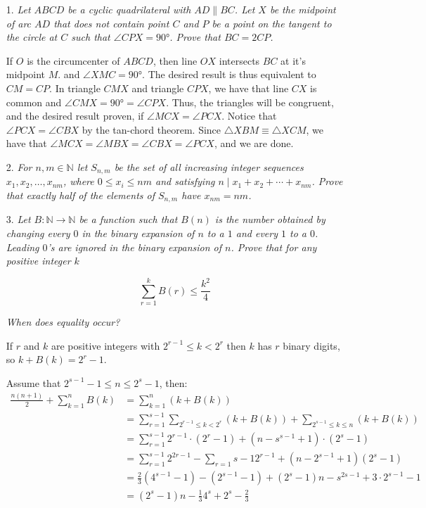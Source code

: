\documentclass{article}
\begin{document}
\begin{enumerate}

\medskip
\item[1.] %
\textit{Let $ABCD$ be a cyclic quadrilateral with $AD \parallel BC$. Let $X$ be the midpoint of arc $AD$ that does not contain point $C$ and $P$ be a point on the tangent to the circle at $C$ such that $\angle CPX = 90 \si{\degree} $. Prove that $BC = 2 CP$.}

If $O$ is the circumcenter of $ABCD$, then line $OX$ intersects $BC$ at it's midpoint $M$. and $\angle XMC = 90 \si{\degree}$. The desired result is thus equivalent to $CM = CP$. In triangle $CMX$ and triangle $CPX$, we have that line $CX$ is common and $\angle CMX = 90 \si{\degree} = \angle CPX$. Thus, the triangles will be congruent, and the desired result proven, if $\angle MCX = \angle PCX$. Notice that $\angle PCX = \angle CBX$ by the tan-chord theorem. Since $\triangle XBM \equiv \triangle XCM$, we have that $\angle MCX = \angle MBX = \angle CBX = \angle PCX$, and we are done.


\medskip
\item[2.] %
\textit{For $n,m\in\mathbb{N}$ let $S_{n,m}$ be the set of all increasing integer sequences $x_{1},x_{2},\ldots,x_{nm}$, where $0\leq x_i\leq nm$ and satisfying $n \mid x_{1} + x_{2} + \cdots +x_{nm}$. Prove that exactly half of the elements of $S_{n,m}$ have $x_{nm}=nm$.}



\medskip
\item[3.] %
\textit{Let $B: \mathbb{N} \rightarrow \mathbb{N}$ be a function such that $B(n)$ is the number obtained by changing every $0$ in the binary expansion of $n$ to a $1$ and every $1$ to a $0$. Leading $0$'s are ignored in the binary expansion of $n$. Prove that for any positive integer $k$}

$$\sum_{r=1}^{k} B(r) \le \frac{k^2}{4}$$

\textit{When does equality occur?}

If $r$ and $k$ are positive integers with $2^{r - 1} \le k < 2^r$ then $k$ has $r$ binary digits, so $k + B(k) = 2^r - 1$.

Assume that $2^{s - 1} - 1 \le n \le 2^s - 1$, then:
\begin{align*}
\frac{n(n + 1)}{2} + \sum_{k = 1}^{n} B(k) &= \sum_{k = 1}^{n} (k + B(k)) \\
&= \sum_{r = 1}^{s - 1} \sum_{2^{r - 1} \le k < 2^r} (k + B(k)) + \sum_{2^{s - 1} \le k \le n} (k + B(k)) \\
&= \sum_{r = 1}^{s - 1} 2^{r - 1} \cdot (2^r - 1) + (n - s^{s - 1} + 1) \cdot (2^s - 1) \\
&= \sum_{r = 1}^{s - 1} 2^{2r - 1} - \sum_{r = 1}{s - 1} 2^{r - 1} + (n - 2^{s - 1} + 1)(2^s - 1) \\
&= \frac{2}{3} (4^{s - 1} - 1) - (2^{s - 1} - 1) + (2^s - 1)n - s^{2s - 1} + 3 \cdot 2^{s - 1} - 1 \\
&= (2^s - 1)n - \frac{1}{3} 4^s + 2^s - \frac{2}{3}
\end{align*}


\end{enumerate}
\end{document}
